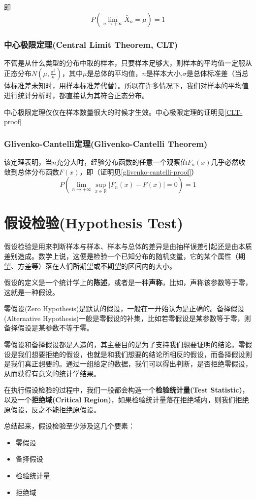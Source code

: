 \documentclass[UTF8]{ctexbook}
\begin{document}
即
\[
	P(\lim_{n\to+\infty}\bar{X}_n=\mu)=1
\]

\subsection{中心极限定理(Central Limit Theorem, CLT)}
\label{CLT}
不管是从什么类型的分布中取的样本，只要样本足够大，则样本的平均值一定服从正态分布$N(\mu,\frac{\sigma^2}{n})$，其中$\mu$是总体的平均值，$n$是样本大小,$\sigma$是总体标准差（当总体标准差未知时，用样本标准差代替）。所以在许多情况下，我们对样本的平均值进行统计分析时，都直接认为其符合正态分布。

中心极限定理仅仅在样本数量很大的时候才生效。中心极限定理的证明见\ref{CLT-proof}
\subsection{Glivenko-Cantelli定理(Glivenko-Cantelli Theorem)}
\label{glivenko-cantelli-theorem}
该定理表明，当$n$充分大时，经验分布函数的任意一个观察值$F_n(x)$几乎必然收敛到总体分布函数$F(x)$，即（证明见\ref{glivenko-cantelli-proof}）
\[
	P\left(\lim_{n\to+\infty}\sup_{x\in\mathbb{R}}|F_n(x)-F(x)|=0\right)=1
\]

\chapter{假设检验(Hypothesis Test)}
\label{hypothesis-test}
假设检验是用来判断样本与样本、样本与总体的差异是由抽样误差引起还是由本质差别造成。数学上说，这便是检验一个已知分布的随机变量，它的某个属性（期望、方差等）落在人们所期望或不期望的区间内的大小。

假设的定义是一个统计学上的\textbf{陈述}，或者是一种\textbf{声称}，比如，声称该参数等于零，这就是一种假设。

零假设(Zero Hypothesis)是默认的假设，一般在一开始认为是正确的。备择假设(Alternative Hypothesis)一般是零假设的补集，比如若零假设是某参数等于零，则备择假设是某参数不等于零。

零假设和备择假设都是人造的，其主要目的是为了支持我们想要证明的结论。零假设是我们想要拒绝的假设，也就是和我们想要的结论所相反的假设，而备择假设则是我们真正想要的。通过一组给定的数据，我们可以得出判断，是否拒绝零假设，从而获得有意义的统计学结果。

在执行假设检验的过程中，我们一般都会构造一个\textbf{检验统计量(Test Statistic)}，以及一个\textbf{拒绝域(Critical Region)}，如果检验统计量落在拒绝域内，则我们拒绝原假设，反之不能拒绝原假设。

总结起来，假设检验至少涉及这几个要素：
\begin{itemize}
	\item 零假设
	\item 备择假设
	\item 检验统计量
	\item 拒绝域
\end{itemize}
\end{document}
